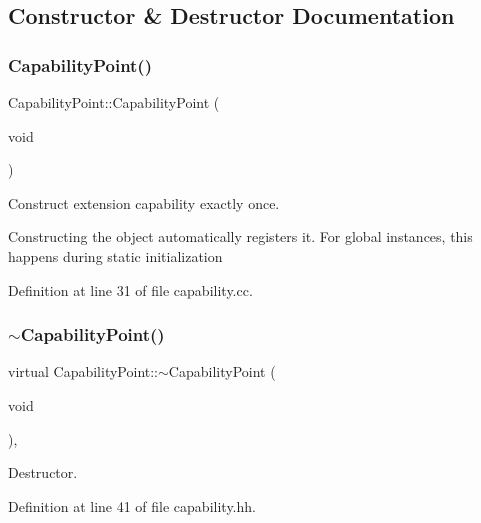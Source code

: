 \subsection{Constructor \& Destructor Documentation}
\mbox{\label{class_capability_point_aeab7831942fb111df63c8ddacafa0c11}} 
\subsubsection{\texorpdfstring{CapabilityPoint()}{CapabilityPoint()}}
{\footnotesize\ttfamily Capability\+Point\+::\+Capability\+Point (\begin{DoxyParamCaption}\item[{void}]{ }\end{DoxyParamCaption})\hspace{0.3cm}{\ttfamily [protected]}}



Construct extension capability exactly once. 

Constructing the object automatically registers it. For global instances, this happens during static initialization 

Definition at line 31 of file capability.\+cc.

\mbox{\label{class_capability_point_aebccad5c6382839cdfc9113b8eff3f33}} 
\subsubsection{\texorpdfstring{$\sim$CapabilityPoint()}{~CapabilityPoint()}}
{\footnotesize\ttfamily virtual Capability\+Point\+::$\sim$\+Capability\+Point (\begin{DoxyParamCaption}\item[{void}]{ }\end{DoxyParamCaption})\hspace{0.3cm}{\ttfamily [inline]}, {\ttfamily [virtual]}}



Destructor. 



Definition at line 41 of file capability.\+hh.



